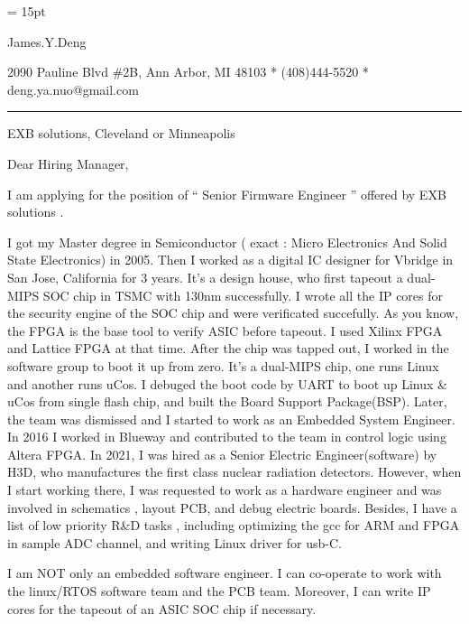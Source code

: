 

  \FFrg \baselineskip = 15pt

{
James.Y.Deng
}

{ 
2090 Pauline Blvd \#2B, Ann Arbor, MI 48103
*
(408)444-5520
*
deng.ya.nuo@gmail.com
}

{ \smallbreak } 

{\par\noindent\hrule} 

{ \bigbreak } 



EXB solutions, 
Cleveland or Minneapolis


{ \bigbreak } 
{ 
Dear Hiring Manager,
}

{ \bigbreak } 
I am applying for the position of `` 
Senior Firmware Engineer
'' offered by EXB solutions .

{ \bigbreak } 
I got my Master degree in Semiconductor ( exact : Micro Electronics And Solid State Electronics) in 2005.
Then I worked as a digital IC designer for Vbridge in San Jose, California for 3 years.
It's a design house, who first tapeout a dual-MIPS SOC chip in TSMC with 130nm successfully.
I wrote all the IP cores for the security engine of the SOC chip and were verificated succefully.
As you know, the FPGA is the base tool to verify ASIC before tapeout.
I used Xilinx FPGA and Lattice FPGA at that time.
After the chip was tapped out, I worked in the software group to boot it up from zero.
It's a dual-MIPS chip, one runs Linux and another runs uCos.
I debuged the boot code by UART to boot up Linux \& uCos from single flash chip,
and built the Board Support Package(BSP).
Later, the team was dismissed and I started to work as an Embedded System Engineer.
In 2016 I worked in Blueway and contributed to the team in control logic using Altera FPGA.
In 2021, I was hired as a Senior Electric Engineer(software) by H3D, 
who manufactures the first class nuclear radiation detectors.
However, when I start working there, I was requested to work as
a hardware engineer and was involved in schematics , layout PCB, and debug electric boards.
Besides, I have a list of low priority R\&D tasks , 
including optimizing the gcc for ARM and FPGA in sample ADC channel,
and writing Linux driver for usb-C.

{ \bigbreak } 
I am NOT only an embedded software engineer. 
I can co-operate to work with the linux/RTOS software team and the PCB team.
Moreover, I can write IP cores for the tapeout of an ASIC SOC chip if necessary.

